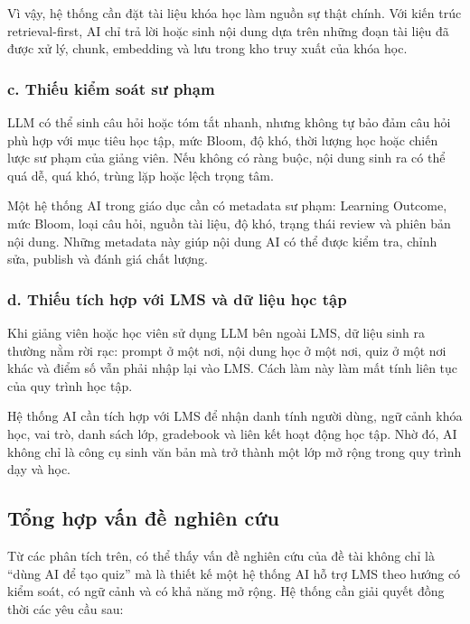 Vì vậy, hệ thống cần đặt tài liệu khóa học làm nguồn sự thật chính. Với kiến
trúc retrieval-first, AI chỉ trả lời hoặc sinh nội dung dựa trên những đoạn tài
liệu đã được xử lý, chunk, embedding và lưu trong kho truy xuất của khóa học.

\subsubsection*{c. Thiếu kiểm soát sư phạm}

LLM có thể sinh câu hỏi hoặc tóm tắt nhanh, nhưng không tự bảo đảm câu hỏi phù
hợp với mục tiêu học tập, mức Bloom, độ khó, thời lượng học hoặc chiến lược sư
phạm của giảng viên. Nếu không có ràng buộc, nội dung sinh ra có thể quá dễ,
quá khó, trùng lặp hoặc lệch trọng tâm.

Một hệ thống AI trong giáo dục cần có metadata sư phạm: Learning Outcome, mức
Bloom, loại câu hỏi, nguồn tài liệu, độ khó, trạng thái review và phiên bản nội
dung. Những metadata này giúp nội dung AI có thể được kiểm tra, chỉnh sửa,
publish và đánh giá chất lượng.

\subsubsection*{d. Thiếu tích hợp với LMS và dữ liệu học tập}

Khi giảng viên hoặc học viên sử dụng LLM bên ngoài LMS, dữ liệu sinh ra thường
nằm rời rạc: prompt ở một nơi, nội dung học ở một nơi, quiz ở một nơi khác và
điểm số vẫn phải nhập lại vào LMS. Cách làm này làm mất tính liên tục của quy
trình học tập.

Hệ thống AI cần tích hợp với LMS để nhận danh tính người dùng, ngữ cảnh khóa
học, vai trò, danh sách lớp, gradebook và liên kết hoạt động học tập. Nhờ đó,
AI không chỉ là công cụ sinh văn bản mà trở thành một lớp mở rộng trong quy
trình dạy và học.

\subsection{Tổng hợp vấn đề nghiên cứu}

Từ các phân tích trên, có thể thấy vấn đề nghiên cứu của đề tài không chỉ là
``dùng AI để tạo quiz'' mà là thiết kế một hệ thống AI hỗ trợ LMS theo hướng có
kiểm soát, có ngữ cảnh và có khả năng mở rộng. Hệ thống cần giải quyết đồng
thời các yêu cầu sau:

